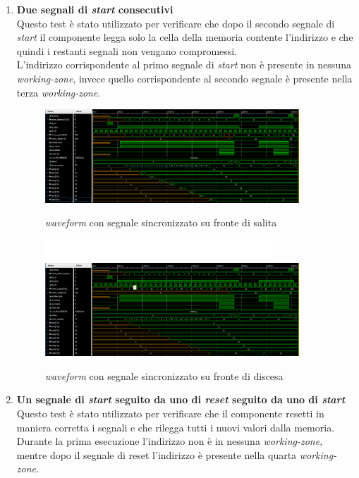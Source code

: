 \documentclass{article}
\begin{document}
\begin{enumerate}
\item\textbf{Due segnali di \textit{start} consecutivi}\\
Questo test è stato utilizzato per verificare che dopo il secondo segnale di \textit{start} il componente legga solo la cella della memoria contente l'indirizzo e che quindi i restanti segnali non vengano compromessi.\\L'indirizzo corrispondente al primo segnale di \textit{start} non è presente in nessuna \textit{working-zone}, invece quello corrispondente al secondo segnale è presente nella terza \textit{working-zone}.
\begin{figure}[h]
    \centering
    \includegraphics[width=0.9\textwidth]{double_start_no_in_f1}
    \caption{\textit{waveform} con segnale sincronizzato su fronte di salita}
    \includegraphics[width=0.8\textwidth]{spazio}
    \includegraphics[width=0.9\textwidth]{double_start_no_in_f0}
    \caption{\textit{waveform} con segnale sincronizzato su fronte di discesa}
\end{figure}
\pagebreak
\item\textbf{Un segnale di \textit{start} seguito da uno di \textit{reset} seguito da uno di \textit{start}}\\
Questo test è stato utilizzato per verificare che il componente resetti in maniera corretta i segnali e che rilegga tutti i nuovi valori dalla memoria.\\Durante la prima esecuzione l'indirizzo non è in nessuna \textit{working-zone}, mentre dopo il segnale di reset l'indirizzo è presente nella quarta \textit{working-zone}.

\end{enumerate}
\end{document}
